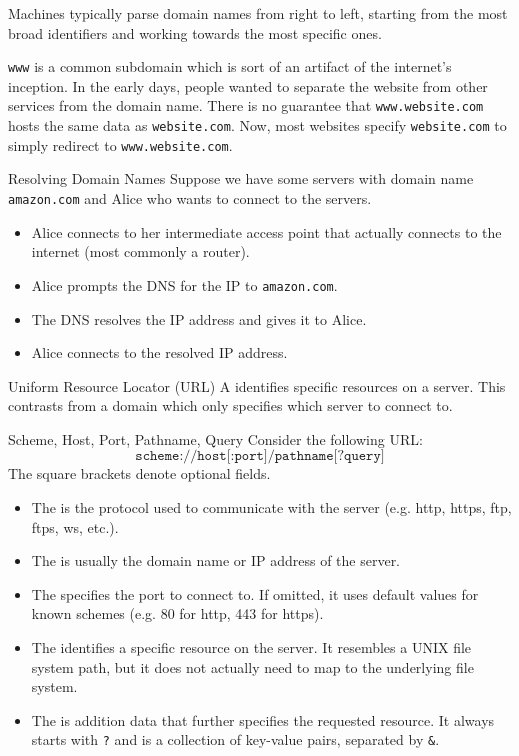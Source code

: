 Machines typically parse domain names from right to left, starting from the most broad identifiers and working towards the most specific ones.

\begin{notebox}
    \texttt{www} is a common subdomain which is sort of an artifact of the internet's inception. In the early days, people wanted to separate the website from other services from the domain name. There is no guarantee that \texttt{www.website.com} hosts the same data as \texttt{website.com}. Now, most websites specify \texttt{website.com} to simply redirect to \texttt{www.website.com}.
\end{notebox}

\begin{tecbox}{Resolving Domain Names}{}
    Suppose we have some servers with domain name \texttt{amazon.com} and Alice who wants to connect to the servers.
    \begin{itemize}
        \item Alice connects to her intermediate access point that actually connects to the internet (most commonly a router).
        \item Alice prompts the DNS for the IP to \texttt{amazon.com}.
        \item The DNS resolves the IP address and gives it to Alice.
        \item Alice connects to the resolved IP address.
    \end{itemize}
\end{tecbox}

\begin{dfnbox}{Uniform Resource Locator (URL)}{}
    A  identifies specific resources on a server. This contrasts from a domain which only specifies which server to connect to.
\end{dfnbox}

\begin{dfnbox}{Scheme, Host, Port, Pathname, Query}{}
    Consider the following URL:
    \[ \texttt{scheme://host[:port]/pathname[?query]} \]
    The square brackets denote optional fields.
    \begin{itemize}
        \item The  is the protocol used to communicate with the server (e.g. http, https, ftp, ftps, ws, etc.).
        \item The  is usually the domain name or IP address of the server.
        \item The  specifies the port to connect to. If omitted, it uses default values for known schemes (e.g. 80 for http, 443 for https).
        \item The  identifies a specific resource on the server. It resembles a UNIX file system path, but it does not actually need to map to the underlying file system.
        \item The  is addition data that further specifies the requested resource. It always starts with \texttt{?} and is a collection of key-value pairs, separated by \texttt{\&}.
    \end{itemize}
\end{dfnbox}

